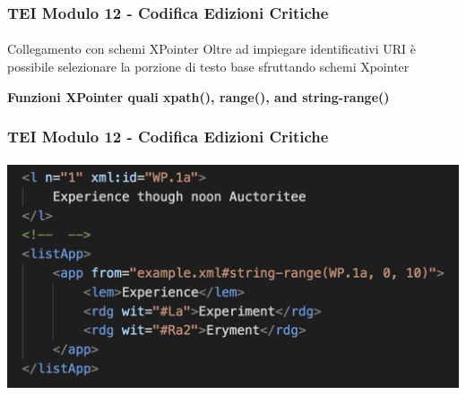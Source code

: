 \begin{frame}
    \frametitle{TEI Modulo 12 - Codifica Edizioni Critiche}
    \framesubtitle{}
    \addtocounter{nframe}{1}
    


    \begin{block}{Collegamento con schemi XPointer}
       Oltre ad impiegare identificativi URI è possibile selezionare la porzione di testo base sfruttando schemi Xpointer
    \end{block}
    \textbf{Funzioni XPointer quali xpath(), range(), and string-range()}

\end{frame}



\begin{frame}
    \frametitle{TEI Modulo 12 - Codifica Edizioni Critiche}
    \framesubtitle{}
    \addtocounter{nframe}{1}




    
    \begin{center}
       \includegraphics[width=.95\textwidth]{imgs/app-xpointer.png}
    \end{center}
   
\end{frame}



